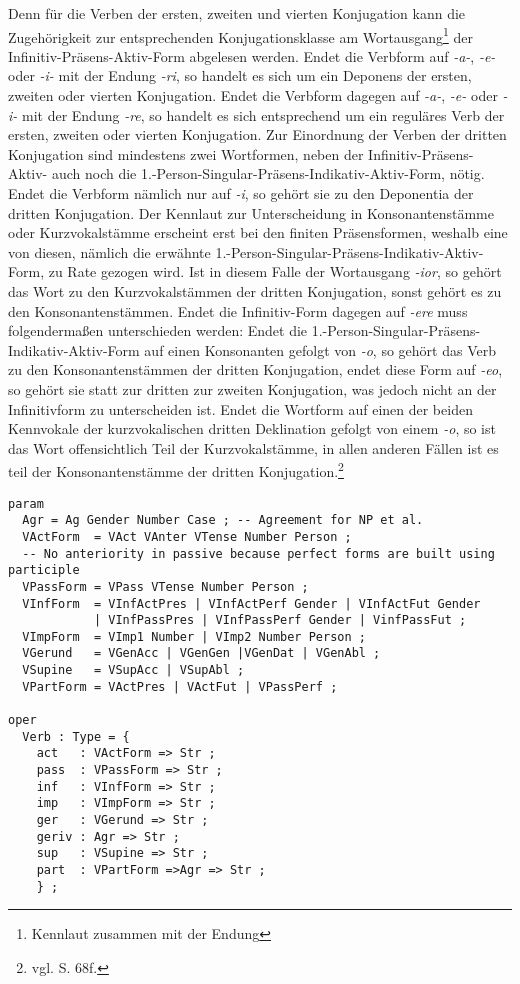 \documentclass[fontsize=12pt,abstract=on,titlepage,bibliography=totoc,ngerman,listof=totoc]{scrreprt}
\begin{document}
Denn für die Verben der ersten, zweiten und vierten Konjugation kann die Zugehörigkeit zur entsprechenden Konjugationsklasse am Wortausgang\footnote{Kennlaut zusammen mit der Endung} der Infinitiv-Präsens-Aktiv-Form abgelesen werden. Endet die Verbform auf \textit{-a-}, \textit{-e-} oder \textit{-i-} mit der Endung \textit{-ri}, so handelt es sich um ein Deponens der ersten, zweiten oder vierten Konjugation. Endet die Verbform dagegen auf \textit{-a-}, \textit{-e-} oder \textit{-i-} mit der Endung \textit{-re}, so handelt es sich entsprechend um ein reguläres Verb der ersten, zweiten oder vierten Konjugation. Zur Einordnung der Verben der dritten Konjugation sind mindestens zwei Wortformen, neben der Infinitiv-Präsens-Aktiv- auch noch die 1.-Person-Singular-Präsens-Indikativ-Aktiv-Form, nötig. Endet die Verbform nämlich nur auf \textit{-i}, so gehört sie zu den Deponentia der dritten Konjugation. Der Kennlaut zur Unterscheidung in Konsonantenstämme oder Kurzvokalstämme erscheint erst bei den finiten Präsensformen, weshalb eine von diesen, nämlich die erwähnte 1.-Person-Singular-Präsens-Indikativ-Aktiv-Form, zu Rate gezogen wird. Ist in diesem Falle der Wortausgang \textit{-ior}, so gehört das Wort zu den Kurzvokalstämmen der dritten Konjugation, sonst gehört es zu den Konsonantenstämmen. Endet die Infinitiv-Form dagegen auf \textit{-ere} muss folgendermaßen unterschieden werden: Endet die 1.-Person-Singular-Präsens-Indikativ-Aktiv-Form auf einen Konsonanten gefolgt von \textit{-o}, so gehört das Verb zu den Konsonantenstämmen der dritten Konjugation, endet diese Form auf \textit{-eo}, so gehört sie statt zur dritten zur zweiten Konjugation, was jedoch nicht an der Infinitivform zu unterscheiden ist. Endet die Wortform auf einen der beiden Kennvokale der kurzvokalischen dritten Deklination gefolgt von einem \textit{-o}, so ist das Wort offensichtlich Teil der Kurzvokalstämme, in allen anderen Fällen ist es teil der Konsonantenstämme der dritten Konjugation.\footnote{vgl. \cite{BAYER-LINDAUER1994} S. 68f.} \par
\begin{lstlisting}[float=ht,label={GF-Res-Verb},caption={Datentyp eines Verbs im Grammatical Framework},basicstyle=\footnotesize]
param
  Agr = Ag Gender Number Case ; -- Agreement for NP et al.
  VActForm  = VAct VAnter VTense Number Person ;
  -- No anteriority in passive because perfect forms are built using participle
  VPassForm = VPass VTense Number Person ;  
  VInfForm  = VInfActPres | VInfActPerf Gender | VInfActFut Gender 
            | VInfPassPres | VInfPassPerf Gender | VinfPassFut ;
  VImpForm  = VImp1 Number | VImp2 Number Person ;
  VGerund   = VGenAcc | VGenGen |VGenDat | VGenAbl ;
  VSupine   = VSupAcc | VSupAbl ;
  VPartForm = VActPres | VActFut | VPassPerf ;

oper
  Verb : Type = {
    act   : VActForm => Str ;
    pass  : VPassForm => Str ;
    inf   : VInfForm => Str ;
    imp   : VImpForm => Str ;
    ger   : VGerund => Str ;
    geriv : Agr => Str ; 
    sup   : VSupine => Str ;
    part  : VPartForm =>Agr => Str ;
    } ;
\end{lstlisting}
\FloatBarrier
\end{document}
